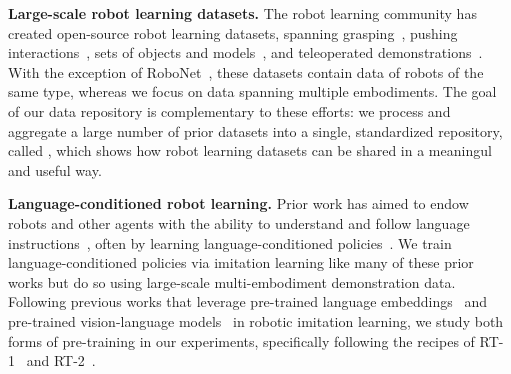 \noindent \textbf{Large-scale robot learning datasets.} The robot learning community has created open-source robot learning datasets, spanning grasping~\cite{jiang2011efficient,Pinto2015SupersizingSL,bohg2015dataset,Mahler2017DexNet2D,depierre2018jacquard,levine2018learning,kalashnikov2018qt,Brahmbhatt2019,fang2020graspnet,acronym2020,bousmalis2018grasping,zhu2023fanuc}, pushing interactions~\cite{yu2016more,finn2017deep,ebert2018visual,dasari2019robonet}, sets of objects and models~\cite{shilane_princeton_2004,wohlkinger_3dnet_2012,kit2012,singh_bigbird_2014,Calli2015YCB,zhirong_wu_3d_2015,xiang_objectnet3d_2016,morrison2020egad,gao2021objectfolder,downs2022google,kalashnikov2021mt}, and teleoperated demonstrations~\cite{DBLP:journals/corr/abs-1811-02790,sharma2018multiple,mandlekar2019scaling,ebert2021bridge,robomimic2021,brohan2023rt1,lynch2023interactive,fang2023rh20t,roboagent,heo2023furniturebench,walke2023bridgedata}. With the exception of RoboNet~\cite{dasari2019robonet}, these datasets contain data of robots of the same type,
whereas we focus on data spanning multiple embodiments. The goal of our data repository is complementary to these efforts: we process and aggregate a large number of prior datasets into a single, standardized repository, called \repo, which shows how robot learning datasets can be shared in a meaningul and useful way. 

\noindent \textbf{Language-conditioned robot learning.} Prior work has aimed to endow robots and other agents with the ability to understand and follow language instructions~\cite{WINOGRAD19721,macmahon2006, kollar2010,chen2011,duvallet2015,Luketina2019ASO}, often by learning language-conditioned policies~\cite{shao2020concept,stepputtis2020language, nair2022learning,mees2022calvin,mees2022matters,jang2022bc,shridhar2022perceiver,brohan2023rt1}. We train language-conditioned policies via imitation learning like many of these prior works but do so using large-scale multi-embodiment demonstration data. Following previous works that leverage pre-trained language embeddings~\cite{hill2020human,shao2020concept,lynch2021grounding,nair2022learning,jang2022bc,ahn2022saycan,jiang2022vima,brohan2023rt1,vemprala2023chatgpt,huang2023voxposer} and pre-trained vision-language models~\cite{shridhar2022cliport,stone2023moo,mu2023embodiedgpt,brohan2023rt2} in robotic imitation learning, we study both forms of pre-training in our experiments, specifically following the recipes of RT-1~\cite{brohan2023rt1} and RT-2~\cite{brohan2023rt2}.

